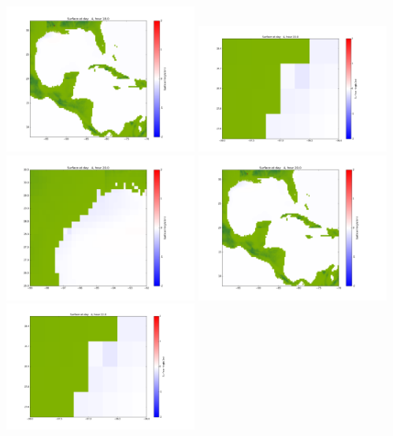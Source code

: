 \documentclass[11pt]{article}
\begin{document}
\vskip 10pt 
\includegraphics[width=0.475\textwidth]{frame0081fig1003.png}
\vskip 10pt 
\includegraphics[width=0.475\textwidth]{frame0082fig1001.png}
\includegraphics[width=0.475\textwidth]{frame0082fig1002.png}
\vskip 10pt 
\includegraphics[width=0.475\textwidth]{frame0082fig1003.png}
\vskip 10pt 
\includegraphics[width=0.475\textwidth]{frame0083fig1001.png}
\end{document}
